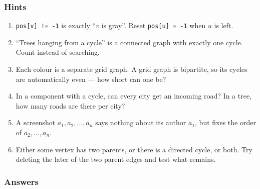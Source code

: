 \subsubsection*{Hints}
\begin{enumerate}[leftmargin=*, label=\textbf{E1.\arabic*}]
    \item \texttt{pos[v] != -1} is exactly ``$v$ is gray''. Reset \texttt{pos[u] = -1} when $u$ is left.
    \item ``Trees hanging from a cycle'' is a connected graph with exactly one cycle. Count instead of searching.
    \item Each colour is a separate grid graph. A grid graph is bipartite, so its cycles are automatically even --- how short can one be?
    \item In a component with a cycle, can every city get an incoming road? In a tree, how many roads are there per city?
    \item A screenshot $a_1, a_2, \dots, a_n$ says nothing about its author $a_1$, but fixes the order of $a_2, \dots, a_n$.
    \item Either some vertex has two parents, or there is a directed cycle, or both. Try deleting the later of the two parent edges and test what remains.
\end{enumerate}

\subsubsection*{Answers}

